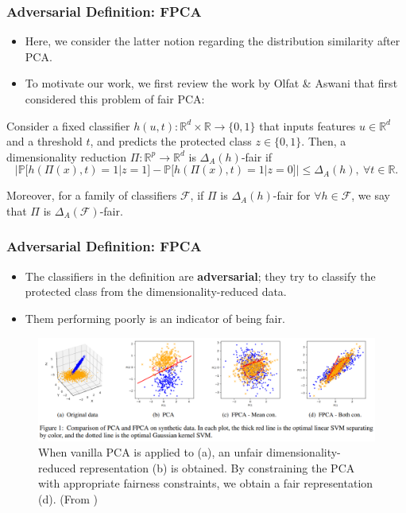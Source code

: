 \documentclass{beamer}
\begin{document}
	\begin{frame}
	\frametitle{Adversarial Definition: FPCA}
	\begin{itemize}
		\item Here, we consider the latter notion regarding the distribution similarity after PCA.
		
		\item To motivate our work, we first review the work by Olfat \& Aswani \cite{OA19} that first considered this problem of fair PCA:
	\end{itemize}

	\begin{definition}
		\label{def:delta-fairness}
		Consider a fixed classifier $h(u, t): \mathbb{R}^d \times \mathbb{R} \rightarrow \{0, 1\}$ that inputs features $u \in \mathbb{R}^d$ and a threshold $t$, and predicts the protected class $z \in \{0, 1\}$.
		Then, a dimensionality reduction $\Pi: \mathbb{R}^p \rightarrow \mathbb{R}^d$ is  $\Delta_A(h)$-fair if
		\begin{equation}
			\Big| \mathbb{P}\big[ h(\Pi(x), t) = 1 | z = 1 \big] - \mathbb{P}\big[ h(\Pi(x), t) = 1 | z = 0 \big] \Big| \leq \Delta_A(h), \ \forall t \in \mathbb{R}.
		\end{equation}
		
		Moreover, for a family of classifiers $\mathcal{F}$, if $\Pi$ is $\Delta_A(h)$-fair for $\forall h \in \mathcal{F}$, we say that $\Pi$ is $\Delta_A(\mathcal{F})$-fair.
	\end{definition}
	\end{frame}

	\begin{frame}
	\frametitle{Adversarial Definition: FPCA}
		\begin{itemize}
			\item The classifiers in the definition are {\bf adversarial}; they try to classify the protected class from the dimensionality-reduced data.
			
			\item Them performing poorly is an indicator of being fair.
		\end{itemize}
	\begin{figure}
		\centering
		\includegraphics[width=\linewidth]{figure2}
		\caption{When vanilla PCA is applied to (a), an unfair dimensionality-reduced representation (b) is obtained. By constraining the PCA with appropriate fairness constraints, we obtain a fair representation (d). (From \cite{OA19})}
		\label{fig:figure2}
	\end{figure}
	\end{frame}
\end{document}
